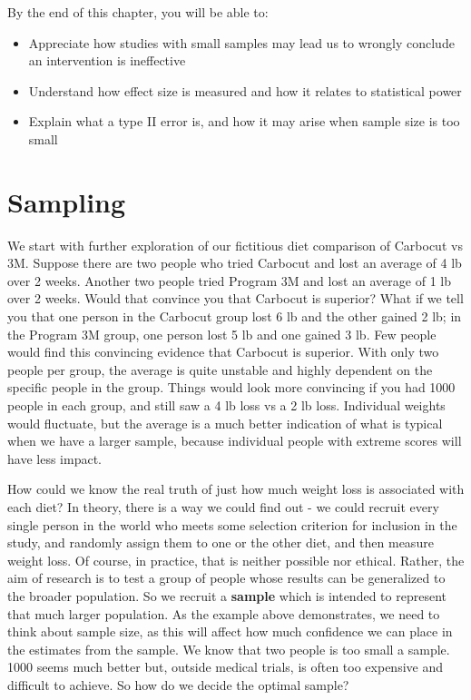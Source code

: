 \documentclass{krantz}
\begin{document}
By the end of this chapter, you will be able to:

\begin{itemize}
\item
  Appreciate how studies with small samples may lead us to wrongly conclude an intervention is ineffective
\item
  Understand how effect size is measured and how it relates to statistical power
\item
  Explain what a type II error is, and how it may arise when sample size is too small
\end{itemize}

\hypertarget{sampling}{%
\section{Sampling}\label{sampling}}

We start with further exploration of our fictitious diet comparison of Carbocut vs 3M. Suppose there are two people who tried Carbocut and lost an average of 4 lb over 2 weeks. Another two people tried Program 3M and lost an average of 1 lb over 2 weeks. Would that convince you that Carbocut is superior? What if we tell you that one person in the Carbocut group lost 6 lb and the other gained 2 lb; in the Program 3M group, one person lost 5 lb and one gained 3 lb. Few people would find this convincing evidence that Carbocut is superior. With only two people per group, the average is quite unstable and highly dependent on the specific people in the group. Things would look more convincing if you had 1000 people in each group, and still saw a 4 lb loss vs a 2 lb loss. Individual weights would fluctuate, but the average is a much better indication of what is typical when we have a larger sample, because individual people with extreme scores will have less impact.

How could we know the real truth of just how much weight loss is associated with each diet? In theory, there is a way we could find out - we could recruit every single person in the world who meets some selection criterion for inclusion in the study, and randomly assign them to one or the other diet, and then measure weight loss. Of course, in practice, that is neither possible nor ethical. Rather, the aim of research is to test a group of people whose results can be generalized to the broader population. So we recruit a \textbf{sample} which is intended to represent that much larger population. As the example above demonstrates, we need to think about sample size, as this will affect how much confidence we can place in the estimates from the sample. We know that two people is too small a sample. 1000 seems much better but, outside medical trials, is often too expensive and difficult to achieve. So how do we decide the optimal sample?
\end{document}
